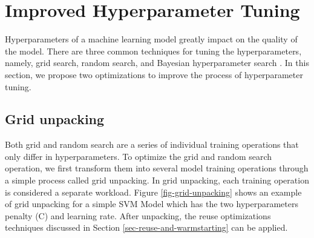 \section{Improved Hyperparameter Tuning} \label{sec-hyperparam-optimization}
Hyperparameters of a machine learning model greatly impact on the quality of the model.
There are three common techniques for tuning the hyperparameters, namely, grid search, random search, and Bayesian hyperparameter search \cite{hutter2011sequential,snoek2012practical}.
In this section, we propose two optimizations to improve the process of hyperparameter tuning.

\subsection{Grid unpacking}
Both grid and random search are a series of individual training operations that only differ in hyperparameters.
To optimize the grid and random search operation, we first transform them into several model training operations through a simple process called grid unpacking.
In grid unpacking, each training operation is considered a separate workload.
Figure \ref{fig-grid-unpacking} shows an example of grid unpacking for a simple SVM Model which has the two hyperparameters penalty (C) and learning rate.
After unpacking, the reuse optimizations techniques discussed in Section \ref{sec-reuse-and-warmstarting} can be applied.
